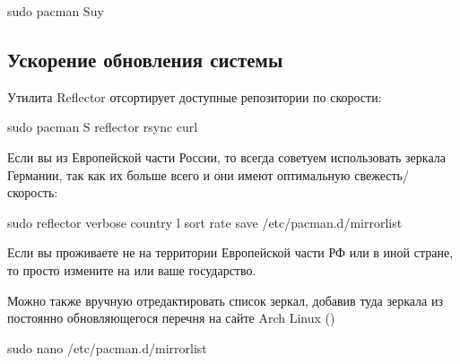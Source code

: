\documentclass[letterpaper,10pt,russian,openany]{sphinxmanual}
\begin{document}
\begin{sphinxVerbatim}[commandchars=\\\{\}]
sudo pacman \PYGZhy{}Suy                     
\end{sphinxVerbatim}

\ignorespaces 

\subsection{Ускорение обновления системы}
\label{\detokenize{source/first-steps:speed-up-system-updates}}\label{\detokenize{source/first-steps:index-3}}\label{\detokenize{source/first-steps:id3}}
\sphinxAtStartPar
Утилита Reflector отсортирует доступные репозитории по скорости:

\begin{sphinxVerbatim}[commandchars=\\\{\}]
sudo pacman \PYGZhy{}S reflector rsync curl  
\end{sphinxVerbatim}

\sphinxAtStartPar
Если вы из Европейской части России, то всегда советуем использовать зеркала Германии,
так как их больше всего и они имеют оптимальную свежесть/скорость:

\begin{sphinxVerbatim}[commandchars=\\\{\}]
sudo reflector \PYGZhy{}\PYGZhy{}verbose \PYGZhy{}\PYGZhy{}country  \PYGZhy{}l  \PYGZhy{}\PYGZhy{}sort rate \PYGZhy{}\PYGZhy{}save /etc/pacman.d/mirrorlist
\end{sphinxVerbatim}

\sphinxAtStartPar
Если вы проживаете не на территории Европейской части РФ или в иной стране, то просто измените  на  или ваше государство.

\sphinxAtStartPar
Можно также вручную отредактировать список зеркал, добавив туда зеркала из постоянно обновляющегося перечня на сайте Arch Linux ()

\begin{sphinxVerbatim}[commandchars=\\\{\}]
sudo nano /etc/pacman.d/mirrorlist 
\end{sphinxVerbatim}
\end{document}
